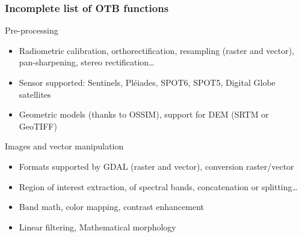 \documentclass[8pt]{beamer}
\begin{document}
\begin{frame}
\frametitle{Incomplete list of OTB functions}

\begin{block}{Pre-processing}
\begin{itemize}
\item Radiometric calibration, orthorectification, resampling (raster and
  vector), pan-sharpening, stereo rectification\ldots
\item Sensor supported: Sentinels, Pléiades, SPOT6, SPOT5, Digital Globe satellites
\item Geometric models (thanks to OSSIM), support for DEM (SRTM or GeoTIFF)
\end{itemize}
\end{block}

\begin{block}{Images and vector manipulation}
\begin{itemize}
\item Formats supported by GDAL (raster and vector), conversion raster/vector
\item Region of interest extraction, of spectral bands, concatenation or splitting\ldots
\item Band math, color mapping, contrast enhancement
\item Linear filtering, Mathematical morphology
\end{itemize}
\end{block}
\end{frame}
\end{document}
